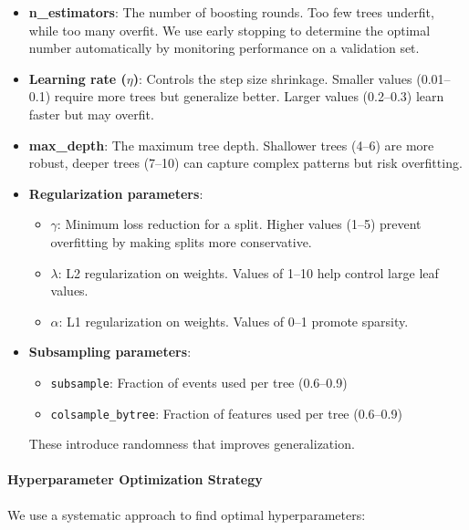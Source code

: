 \begin{itemize}
    \item \textbf{n\_estimators}: The number of boosting rounds. Too few trees underfit, while too many overfit. We use early stopping to determine the optimal number automatically by monitoring performance on a validation set.
    
    \item \textbf{Learning rate ($\eta$)}: Controls the step size shrinkage. Smaller values (0.01–0.1) require more trees but generalize better. Larger values (0.2–0.3) learn faster but may overfit.
    
    \item \textbf{max\_depth}: The maximum tree depth. Shallower trees (4–6) are more robust, deeper trees (7–10) can capture complex patterns but risk overfitting.
    
    \item \textbf{Regularization parameters}:
    \begin{itemize}
        \item $\gamma$: Minimum loss reduction for a split. Higher values (1–5) prevent overfitting by making splits more conservative.
        \item $\lambda$: L2 regularization on weights. Values of 1–10 help control large leaf values.
        \item $\alpha$: L1 regularization on weights. Values of 0–1 promote sparsity.
    \end{itemize}
    
    \item \textbf{Subsampling parameters}:
    \begin{itemize}
        \item \texttt{subsample}: Fraction of events used per tree (0.6–0.9)
        \item \texttt{colsample\_bytree}: Fraction of features used per tree (0.6–0.9)
    \end{itemize}
    These introduce randomness that improves generalization.
\end{itemize}

\paragraph{Hyperparameter Optimization Strategy}

We use a systematic approach to find optimal hyperparameters:

